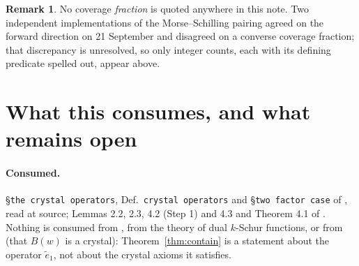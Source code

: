 \documentclass[11pt]{article}
\theoremstyle{definition}
\newtheorem{rem}[thm]{Remark}
\newcommand{\et}{\tilde e_1}
\begin{document}
\begin{rem}
No coverage \emph{fraction} is quoted anywhere in this note. Two independent implementations of
the Morse--Schilling pairing agreed on the forward direction on 21 September and disagreed on a
converse coverage fraction; that discrepancy is unresolved, so only integer counts, each with
its defining predicate spelled out, appear above.
\end{rem}

\section{What this consumes, and what remains open}\label{sec:gaps}

\paragraph{Consumed.} \S\texttt{the crystal operators}, Def.~\texttt{crystal operators} and \S\texttt{two factor case} of \cite{MS}, read at source; Lemmas
2.2, 2.3, 4.2 (Step 1) and 4.3 and Theorem 4.1 of \cite{Clio2}. Nothing is consumed from
\cite{Lam2008}, from the theory of dual $k$-Schur functions, or from
\cite[Thm.~\texttt{theorem.crystal}]{MS} (that $B(w)$ is a crystal): Theorem~\ref{thm:contain} is a statement about
the operator $\et$, not about the crystal axioms it satisfies.
\end{document}
